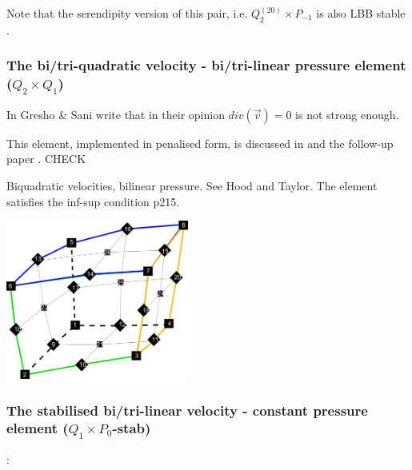 Note that the serendipity version of this pair, i.e. $Q_2^{(20)}\times P_{-1}$ is also LBB stable
\cite[p180]{reddybook2}.


\subsubsection{The bi/tri-quadratic velocity - bi/tri-linear pressure element ($Q_2 \times Q_1$)}
\label{ss:pairq2q1}

\begin{minipage}[t]{0.5\textwidth}

\end{minipage}
\begin{minipage}[t]{0.5\textwidth}

\end{minipage}


In \cite{grsa} Gresho \& Sani write that in their opinion $div(\vec v)=0$ is not strong enough.

This element, implemented in penalised form, is discussed in \cite{been79} and the follow-up paper \cite{been80}. CHECK

Biquadratic velocities, bilinear pressure. See Hood and Taylor. The element satisfies the inf-sup condition \cite{hugh}p215. 

\begin{center}
\includegraphics[width=6cm]{images/q2q1/q2numering}
\end{center}

\subsubsection{The stabilised bi/tri-linear velocity -  constant pressure element ($Q_1\times P_0$-stab)}

\Literature: \cite{sike90,qizh07,lisi12}

